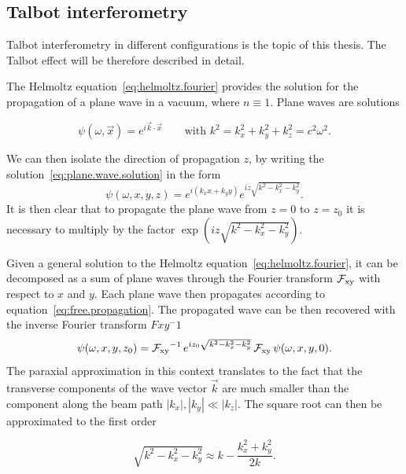 \subsection{Talbot interferometry}
Talbot interferometry in different configurations is the topic of this
thesis. The Talbot effect will be therefore described in detail.

The Helmoltz equation~\eqref{eq:helmoltz.fourier} provides the solution for
the propagation of a plane wave in a vacuum, where $n \equiv 1$. Plane waves
are solutions

\begin{equation}
    \psi(\omega, \vec{x}) = e^{i\vec{k}\cdot \vec{x}} \qquad \text{with } k^2
    = k_x^2 + k_y^2 + k_z^2 = c^2 \omega^2.
    \label{eq:plane.wave.solution}
\end{equation}

We can then isolate the direction
of propagation $z$, by writing the solution~\eqref{eq:plane.wave.solution} in the form
\begin{equation}
    \psi(\omega, x, y, z) = e^{i(k_x x + k_y y)}e^{iz\sqrt{k^2 - k_x^2 -
    k_y^2}}.
    \label{eq:free.propagation}
\end{equation}
It is then clear that to propagate the plane wave from $z = 0$ to $z = z_0$
it is necessary to multiply by the factor $\exp(iz\sqrt{k^2 - k_x^2 -
k_y^2})$.

Given a general solution to the Helmoltz
equation~\eqref{eq:helmoltz.fourier}, it can be decomposed as a sum of plane
waves through the Fourier transform $\operatorname{\mathcal{F}_{xy}}$ with respect to $x$ and $y$. Each
plane wave then propagates according to
equation~\eqref{eq:free.propagation}. The propagated wave can be then
recovered with the inverse Fourier transform $Fxy^-1$
\begin{equation}
    \psi(\omega, x, y, z_0) = \operatorname{\mathcal{F}_{xy}}^{-1}e^{i z_0 \sqrt{k^2 - k_x^2 -
    k_y^2}}\operatorname{\mathcal{F}_{xy}}    \psi(\omega, x, y, 0).
    \label{eq:full.propagator}
\end{equation}
The paraxial approximation in this context translates to the fact that the
transverse components of the wave vector $\vec{k}$ are much smaller than the
component along the beam path $|k_x|, |k_y| \ll |k_z|$. The square root can
then be approximated to the first order

\begin{equation}
    \sqrt{k^2 - k_x^2 - k_y^2} \approx k - \frac{k_x^2 + k_y^2}{2k}.
    \label{eq:square.root.approximation}
\end{equation}

